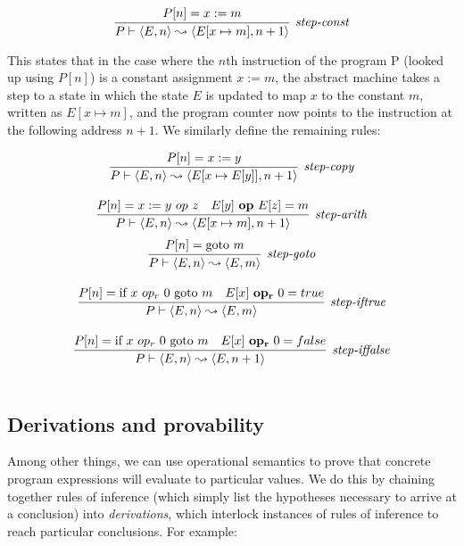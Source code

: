 \documentclass[11pt]{article}
\begin{document}
\[
\infer[\textit{step-const}]{P \vdash \langle E,n \rangle \leadsto \langle E[x \mapsto m],n+1 \rangle}{P[n] = x := m}
\]

This states that in the case where the $n$th instruction of the program P (looked up using $P[n]$) is a constant assignment $x := m$, the abstract machine takes a step to a state in which the state $E$ is updated to map $x$ to the constant $m$, written as $E[x \mapsto m]$, and the program counter now points to the instruction at the following address $n+1$.
%
We similarly define the remaining rules:

\[
\begin{array}{c}
\infer[\textit{step-copy}]
	{P \vdash \langle E,n \rangle \leadsto \langle E[x \mapsto E[y]],n+1 \rangle}
	{P[n] = x := y}\\[3ex]
    
\infer[\textit{step-arith}]
	{P \vdash \langle E, n \rangle \leadsto \langle E[x \mapsto m],n+1 \rangle}
	{P[n] = x := y ~op~ z & E[y] ~\mathbf{op}~ E[z] = m}\\
\end{array}
\]
\[
\begin{array}{c}	

\infer[\textit{step-goto}]
	{P \vdash \langle E,n \rangle \leadsto \langle E,m \rangle}
	{P[n] = \mbox{goto}~m}\\[3ex]
	
\infer[\textit{step-iftrue}]
	{P \vdash \langle E,n \rangle \leadsto \langle E,m \rangle}
	{P[n] = \mbox{if}~x~op_r~0~\mbox{goto}~m & E[x] ~\mathbf{op_r}~ 0 = true}\\[3ex]
	
\infer[\textit{step-iffalse}]
	{P \vdash \langle E,n \rangle \leadsto \langle E,n+1 \rangle}
	{P[n] = \mbox{if}~x~op_r~0~\mbox{goto}~m & E[x] ~\mathbf{op_r}~ 0 = false}\\[3ex]
	
\end{array}
\]


\subsection{Derivations and provability} 

Among other things, we can use operational semantics to prove that concrete
program expressions will evaluate to particular values.  We do this by chaining
together rules of inference (which simply list the hypotheses necessary to
arrive at a conclusion) into \emph{derivations}, which interlock instances of
rules of inference to reach particular conclusions.  For example:
\end{document}
